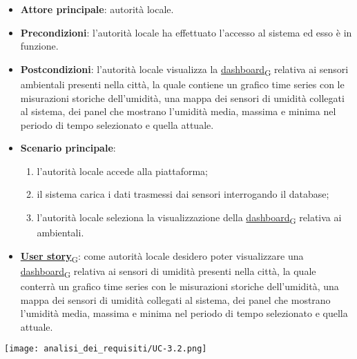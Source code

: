 \newpage
{}
\begin{itemize}
	\item \textbf{Attore principale}: autorità locale.
	\item \textbf{Precondizioni}: l'autorità locale ha effettuato l'accesso al sistema ed esso è in funzione.
	\item \textbf{Postcondizioni}: l'autorità locale visualizza la \href{https://7last.github.io/docs/pb/documentazione-interna/glossario\#dashboard}{dashboard\textsubscript{G}} relativa ai sensori ambientali presenti nella città, la quale contiene un grafico time series con le misurazioni storiche dell'umidità, una mappa dei sensori di umidità collegati al sistema, dei panel che mostrano l'umidità media, massima e minima nel periodo di tempo selezionato e quella attuale.
	\item \textbf{Scenario principale}:
	      \begin{enumerate}
		      \item l'autorità locale accede alla piattaforma;
		      \item il sistema carica i dati trasmessi dai sensori interrogando il database;
		      \item l'autorità locale seleziona la visualizzazione della \href{https://7last.github.io/docs/pb/documentazione-interna/glossario\#dashboard}{dashboard\textsubscript{G}} relativa ai ambientali.
	      \end{enumerate}
	\item \href{https://7last.github.io/docs/pb/documentazione-interna/glossario\#user-story}{\textbf{User story}\textsubscript{G}}:
	      come autorità locale desidero poter visualizzare una \href{https://7last.github.io/docs/pb/documentazione-interna/glossario\#dashboard}{dashboard\textsubscript{G}} relativa ai sensori di umidità presenti nella città, la quale conterrà un grafico time series con le misurazioni storiche dell'umidità, una mappa dei sensori di umidità collegati al sistema, dei panel che mostrano l'umidità media, massima e minima nel periodo di tempo selezionato e quella attuale.
\end{itemize}
\begin{center}
	\texttt{[image: analisi\_dei\_requisiti/UC-3.2.png]}
\end{center}

